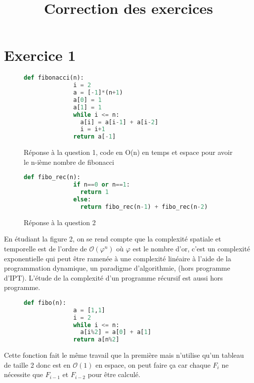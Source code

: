 \documentclass{article}
\title{Correction des exercices}
\author{}
\begin{document}
    \maketitle
    \section{Exercice 1}
    \begin{figure}[H]
        \begin{lstlisting}[language=Python]
            def fibonacci(n):
              i = 2
              a = [-1]*(n+1)
              a[0] = 1
              a[1] = 1
              while i <= n:
                a[i] = a[i-1] + a[i-2]
                i = i+1
              return a[-1]
        \end{lstlisting}
        \caption{Réponse à la question 1, code en O(n) en temps et espace pour avoir le n-ième nombre de fibonacci}
    \end{figure}
    \begin{figure}[H]
        \begin{lstlisting}[language=Python]
            def fibo_rec(n):
              if n==0 or n==1:
                return 1
              else:
                return fibo_rec(n-1) + fibo_rec(n-2)
        \end{lstlisting}
        \caption{Réponse à la question 2}
    \end{figure}
    En étudiant la figure 2, on se rend compte que la complexité spatiale et temporelle est de l'ordre de $\mathcal{O}(\varphi^n)$ 
    où $\varphi$ est le nombre d'or, c'est un complexité exponentielle qui peut être ramenée à une complexité linéaire à l'aide de la programmation 
    dynamique, un paradigme d'algorithmie, (hors programme d'IPT). L'étude de la complexité d'un programme récursif est aussi hors programme.
    \begin{figure}[H]
        \begin{lstlisting}[language=Python]
            def fibo(n):
              a = [1,1]
              i = 2
              while i <= n:
                a[i%2] = a[0] + a[1]
              return a[n%2]
        \end{lstlisting}
    \end{figure}
    Cette fonction fait le même travail que la première mais n'utilise qu'un tableau de taille 2 donc est en $\mathcal{O}(1)$ en espace, 
    on peut faire ça car chaque $F_i$ ne nécessite que $F_{i-1}$ et $F_{i-2}$ pour être calculé. 
\end{document}
